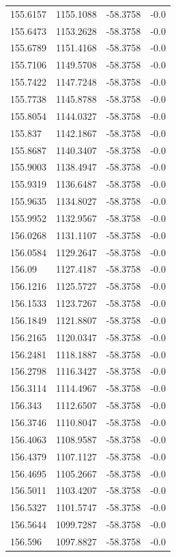 \begin{table}[H]
\begin{tabular}{llll}
155.6157 & 1155.1088 & -58.3758 & -0.0 \\
155.6473 & 1153.2628 & -58.3758 & -0.0 \\
155.6789 & 1151.4168 & -58.3758 & -0.0 \\
155.7106 & 1149.5708 & -58.3758 & -0.0 \\
155.7422 & 1147.7248 & -58.3758 & -0.0 \\
155.7738 & 1145.8788 & -58.3758 & -0.0 \\
155.8054 & 1144.0327 & -58.3758 & -0.0 \\
155.837 & 1142.1867 & -58.3758 & -0.0 \\
155.8687 & 1140.3407 & -58.3758 & -0.0 \\
155.9003 & 1138.4947 & -58.3758 & -0.0 \\
155.9319 & 1136.6487 & -58.3758 & -0.0 \\
155.9635 & 1134.8027 & -58.3758 & -0.0 \\
155.9952 & 1132.9567 & -58.3758 & -0.0 \\
156.0268 & 1131.1107 & -58.3758 & -0.0 \\
156.0584 & 1129.2647 & -58.3758 & -0.0 \\
156.09 & 1127.4187 & -58.3758 & -0.0 \\
156.1216 & 1125.5727 & -58.3758 & -0.0 \\
156.1533 & 1123.7267 & -58.3758 & -0.0 \\
156.1849 & 1121.8807 & -58.3758 & -0.0 \\
156.2165 & 1120.0347 & -58.3758 & -0.0 \\
156.2481 & 1118.1887 & -58.3758 & -0.0 \\
156.2798 & 1116.3427 & -58.3758 & -0.0 \\
156.3114 & 1114.4967 & -58.3758 & -0.0 \\
156.343 & 1112.6507 & -58.3758 & -0.0 \\
156.3746 & 1110.8047 & -58.3758 & -0.0 \\
156.4063 & 1108.9587 & -58.3758 & -0.0 \\
156.4379 & 1107.1127 & -58.3758 & -0.0 \\
156.4695 & 1105.2667 & -58.3758 & -0.0 \\
156.5011 & 1103.4207 & -58.3758 & -0.0 \\
156.5327 & 1101.5747 & -58.3758 & -0.0 \\
156.5644 & 1099.7287 & -58.3758 & -0.0 \\
156.596 & 1097.8827 & -58.3758 & -0.0 \\

\end{tabular}
\end{table}
